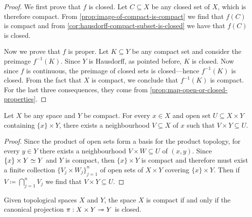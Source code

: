 \begin{proof}
    We first prove that \(f\) is closed. Let \(C \subseteq X\) be any closed set of
    \(X\), which is therefore compact. From \cref{prop:image-of-compact-is-compact}
    we find that \(f(C)\) is compact and from
    \cref{cor:hausdorff-compact-subset-is-closed} we have that \(f(C)\) is closed.

    Now we prove that \(f\) is proper. Let \(K \subseteq Y\) be any compact set and
    consider the preimage \(f^{-1}(K)\). Since \(Y\) is Hausdorff, as pointed
    before, \(K\) is closed. Now since \(f\) is continuous, the preimage of closed
    sets is closed---hence \(f^{-1}(K)\) is closed. From the fact that \(X\) is
    compact, we conclude that \(f^{-1}(K)\) is compact. For the last three
    consequences, they come from \cref{prop:map-open-or-closed-properties}.
\end{proof}

\begin{lemma}
    \label{lem:tube-lemma}
    Let \(X\) be any space and \(Y\) be compact. For every \(x \in X\) and open set
    \(U \subseteq X \times Y\) containing \(\{x\} \times Y\), there exists a
    neighbourhood \(V \subseteq X\) of \(x\) such that \(V \times Y \subseteq U\).
\end{lemma}

\begin{proof}
    Since the product of open sets form a basis for the product topology, for every
    \(y \in Y\) there exists a neighbourhood \(V \times W \subseteq U\) of
    \((x, y)\). Since \(\{x\} \times Y \simeq Y\) and \(Y\) is compact, then
    \(\{x\} \times Y\) is compact and therefore must exist a finite collection
    \(\{V_j \times W_j\}_{j=1}^n\) of open sets of \(X \times Y\) covering
    \(\{x\} \times Y\). Then if \(V \coloneq \bigcap_{j=1}^n V_j\) we find that
    \(V \times Y \subseteq U\).
\end{proof}

\begin{theorem}
    \label{prop:compact-iff-projection-closed}
    Given topological spaces \(X\) and \(Y\), the space \(X\) is compact if and only
    if the canonical projection \(\pi: X \times Y \twoheadrightarrow Y\) is closed.
\end{theorem}

